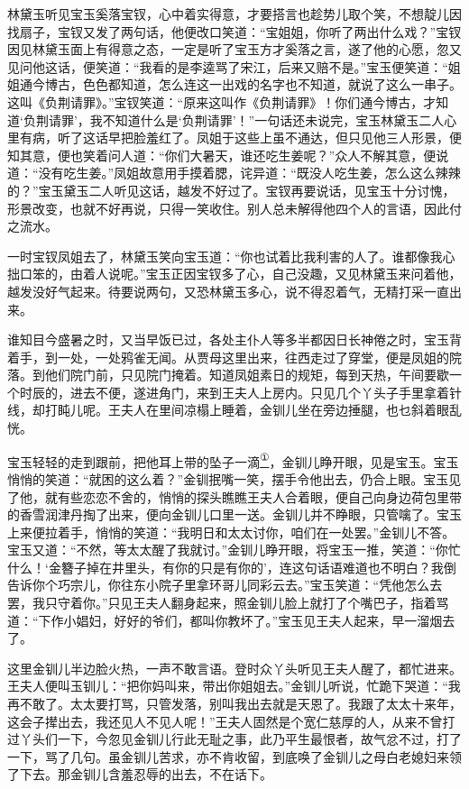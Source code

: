 林黛玉听见宝玉奚落宝钗，心中着实得意，才要搭言也趁势儿取个笑，不想靛儿因找扇子，宝钗又发了两句话，他便改口笑道：``宝姐姐，你听了两出什么戏？''宝钗因见林黛玉面上有得意之态，一定是听了宝玉方才奚落之言，遂了他的心愿，忽又见问他这话，便笑道：``我看的是李逵骂了宋江，后来又赔不是。''宝玉便笑道：``姐姐通今博古，色色都知道，怎么连这一出戏的名字也不知道，就说了这么一串子。这叫《负荆请罪》。''宝钗笑道：``原来这叫作《负荆请罪》！你们通今博古，才知道`负荆请罪'，我不知道什么是`负荆请罪'！''一句话还未说完，宝玉林黛玉二人心里有病，听了这话早把脸羞红了。凤姐于这些上虽不通达，但只见他三人形景，便知其意，便也笑着问人道：``你们大暑天，谁还吃生姜呢？''众人不解其意，便说道：``没有吃生姜。''凤姐故意用手摸着腮，诧异道：``既没人吃生姜，怎么这么辣辣的？''宝玉黛玉二人听见这话，越发不好过了。宝钗再要说话，见宝玉十分讨愧，形景改变，也就不好再说，只得一笑收住。别人总未解得他四个人的言语，因此付之流水。

一时宝钗凤姐去了，林黛玉笑向宝玉道：``你也试着比我利害的人了。谁都像我心拙口笨的，由着人说呢。''宝玉正因宝钗多了心，自己没趣，又见林黛玉来问着他，越发没好气起来。待要说两句，又恐林黛玉多心，说不得忍着气，无精打采一直出来。

谁知目今盛暑之时，又当早饭已过，各处主仆人等多半都因日长神倦之时，宝玉背着手，到一处，一处鸦雀无闻。从贾母这里出来，往西走过了穿堂，便是凤姐的院落。到他们院门前，只见院门掩着。知道凤姐素日的规矩，每到天热，午间要歇一个时辰的，进去不便，遂进角门，来到王夫人上房内。只见几个丫头子手里拿着针线，却打盹儿呢。王夫人在里间凉榻上睡着，金钏儿坐在旁边捶腿，也乜斜着眼乱恍。

宝玉轻轻的走到跟前，把他耳上带的坠子一滴\href{../Text/part0034_split_000.html\#lnkback_1_a}{\textsuperscript{①}}，金钏儿睁开眼，见是宝玉。宝玉悄悄的笑道：``就困的这么着？''金钏抿嘴一笑，摆手令他出去，仍合上眼。宝玉见了他，就有些恋恋不舍的，悄悄的探头瞧瞧王夫人合着眼，便自己向身边荷包里带的香雪润津丹掏了出来，便向金钏儿口里一送。金钏儿并不睁眼，只管噙了。宝玉上来便拉着手，悄悄的笑道：``我明日和太太讨你，咱们在一处罢。''金钏儿不答。宝玉又道：``不然，等太太醒了我就讨。''金钏儿睁开眼，将宝玉一推，笑道：``你忙什么！`金簪子掉在井里头，有你的只是有你的'，连这句话语难道也不明白？我倒告诉你个巧宗儿，你往东小院子里拿环哥儿同彩云去。''宝玉笑道：``凭他怎么去罢，我只守着你。''只见王夫人翻身起来，照金钏儿脸上就打了个嘴巴子，指着骂道：``下作小娼妇，好好的爷们，都叫你教坏了。''宝玉见王夫人起来，早一溜烟去了。

这里金钏儿半边脸火热，一声不敢言语。登时众丫头听见王夫人醒了，都忙进来。王夫人便叫玉钏儿：``把你妈叫来，带出你姐姐去。''金钏儿听说，忙跪下哭道：``我再不敢了。太太要打骂，只管发落，别叫我出去就是天恩了。我跟了太太十来年，这会子撵出去，我还见人不见人呢！''王夫人固然是个宽仁慈厚的人，从来不曾打过丫头们一下，今忽见金钏儿行此无耻之事，此乃平生最恨者，故气忿不过，打了一下，骂了几句。虽金钏儿苦求，亦不肯收留，到底唤了金钏儿之母白老媳妇来领了下去。那金钏儿含羞忍辱的出去，不在话下。

